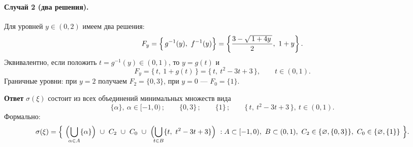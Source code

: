 \documentclass[12pt]{article}
\begin{document}
    \paragraph{Случай 2 (два решения).}
    Для уровней $y\in(0,2)$ имеем два решения:
    \[
        F_y=\Bigl\{\,g^{-1}(y),\ f^{-1}(y)\Bigr\}
        =\left\{\frac{3-\sqrt{\,1+4y\,}}{2},\ 1+y\right\}.
    \]
    Эквивалентно, если положить $t=g^{-1}(y)\in(0,1)$, то $y=g(t)$ и
    \[
        F_y=\{\,t,\ 1+g(t)\,\}=\{\,t,\ t^2-3t+3\,\},\qquad t\in(0,1).
    \]
    Граничные уровни: при $y=2$ получаем $F_2=\{0,3\}$, при $y=0$ — $F_0=\{1\}$.

    \medskip
    \noindent\textbf{Ответ}
    $\sigma(\xi)$ состоит из всех объединений минимальных множеств вида
    \[
        \{\alpha\},\ \alpha\in[-1,0)\,;\qquad
        \{0,3\}\,;\qquad
        \{1\}\,;\qquad
        \{\,t,\ t^2-3t+3\,\},\ t\in(0,1).
    \]
    Формально:
    \[
        \sigma(\xi)=\Bigl\{\
        \Bigl(\!\bigcup_{\alpha\in A}\{\alpha\}\Bigr)\ \cup\ C_2\ \cup\ C_0\ \cup\
        \Bigl(\!\bigcup_{t\in B}\{t,\ t^2-3t+3\}\Bigr)\ :

        A\subset[-1,0),\ B\subset(0,1),\ C_2\in\{\varnothing,\{0,3\}\},\ C_0\in\{\varnothing,\{1\}\}
        \ \Bigr\}.
    \]
\end{document}
